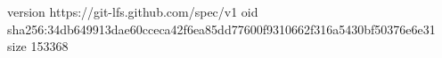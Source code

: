 version https://git-lfs.github.com/spec/v1
oid sha256:34db649913dae60cceca42f6ea85dd77600f9310662f316a5430bf50376e6e31
size 153368
